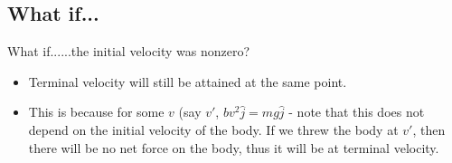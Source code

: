 





\subsection{What if...}
\begin{frame}{What if...}{...the initial velocity was nonzero?}
\begin{itemize}
    \item Terminal velocity will still be attained at the same point.
    \item This is because for some \(v\) (say \(v'\), \(bv^2\hat{j} = mg\hat{j}\) - 
    note that this does not depend on the initial velocity of the body. If we threw
    the body at \(v'\), then there will be no net force on the body, thus it will 
    be at terminal velocity.
\end{itemize}
\end{frame}